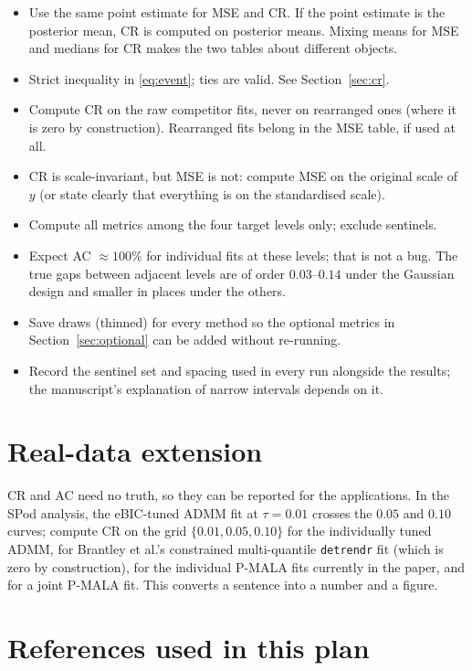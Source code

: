 \documentclass[11pt]{article}
\begin{document}
\begin{itemize}[leftmargin=*]
\item Use the same point estimate for MSE and CR. If the point estimate is the posterior mean, CR is computed on posterior means. Mixing means for MSE and medians for CR makes the two tables about different objects.
\item Strict inequality in \eqref{eq:event}; ties are valid. See Section~\ref{sec:cr}.
\item Compute CR on the raw competitor fits, never on rearranged ones (where it is zero by construction). Rearranged fits belong in the MSE table, if used at all.
\item CR is scale-invariant, but MSE is not: compute MSE on the original scale of $y$ (or state clearly that everything is on the standardised scale).
\item Compute all metrics among the four target levels only; exclude sentinels.
\item Expect AC $\approx 100\%$ for individual fits at these levels; that is not a bug. The true gaps between adjacent levels are of order $0.03$--$0.14$ under the Gaussian design and smaller in places under the others.
\item Save draws (thinned) for every method so the optional metrics in Section~\ref{sec:optional} can be added without re-running.
\item Record the sentinel set and spacing used in every run alongside the results; the manuscript's explanation of narrow intervals depends on it.
\end{itemize}

\section{Real-data extension}

CR and AC need no truth, so they can be reported for the applications. In the SPod analysis, the eBIC-tuned ADMM fit at $\tau=0.01$ crosses the $0.05$ and $0.10$ curves; compute CR on the grid $\{0.01,0.05,0.10\}$ for the individually tuned ADMM, for Brantley et al.'s constrained multi-quantile \texttt{detrendr} fit (which is zero by construction), for the individual P-MALA fits currently in the paper, and for a joint P-MALA fit. This converts a sentence into a number and a figure.

\section*{References used in this plan}
\end{document}
